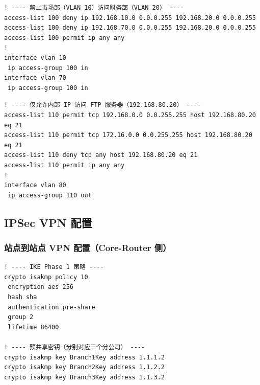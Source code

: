 \documentclass[12pt,a4paper]{ctexart}
\begin{document}
\begin{lstlisting}[caption={ACL 配置 — 部门间访问控制}, label={lst:acl-dept}]
! ---- 禁止市场部（VLAN 10）访问财务部（VLAN 20） ----
access-list 100 deny ip 192.168.10.0 0.0.0.255 192.168.20.0 0.0.0.255
access-list 100 deny ip 192.168.70.0 0.0.0.255 192.168.20.0 0.0.0.255
access-list 100 permit ip any any
!
interface vlan 10
 ip access-group 100 in
interface vlan 70
 ip access-group 100 in
\end{lstlisting}

\begin{lstlisting}[caption={ACL 配置 — FTP 访问控制}, label={lst:acl-ftp}]
! ---- 仅允许内部 IP 访问 FTP 服务器（192.168.80.20） ----
access-list 110 permit tcp 192.168.0.0 0.0.255.255 host 192.168.80.20 eq 21
access-list 110 permit tcp 172.16.0.0 0.0.255.255 host 192.168.80.20 eq 21
access-list 110 deny tcp any host 192.168.80.20 eq 21
access-list 110 permit ip any any
!
interface vlan 80
 ip access-group 110 out
\end{lstlisting}

\subsection{IPSec VPN 配置}

\subsubsection{站点到站点 VPN 配置（Core-Router 侧）}

\begin{lstlisting}[caption={IPSec VPN Phase 1 — IKE/ISAKMP 策略}, label={lst:vpn-ike}]
! ---- IKE Phase 1 策略 ----
crypto isakmp policy 10
 encryption aes 256
 hash sha
 authentication pre-share
 group 2
 lifetime 86400

! ---- 预共享密钥（分别对应三个分公司） ----
crypto isakmp key Branch1Key address 1.1.1.2
crypto isakmp key Branch2Key address 1.1.2.2
crypto isakmp key Branch3Key address 1.1.3.2
\end{lstlisting}
\end{document}
